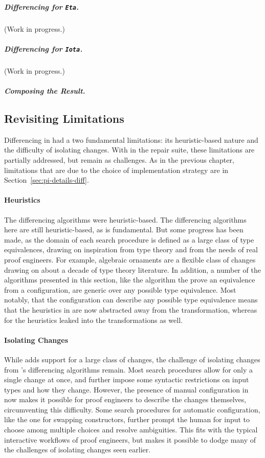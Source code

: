 \subparagraph*{Differencing for \lstinline{Eta}.} (Work in progress.)

\subparagraph*{Differencing for \lstinline{Iota}.} (Work in progress.)

\subparagraph*{Composing the Result.} %
\fi

\subsection{Revisiting Limitations}
\label{sec:pi-diff-limits}

Differencing in \sysname had a two fundamental limitations: its heuristic-based nature
and the difficulty of isolating changes.
With \toolnamec in the \sysnamelong repair suite, these limitations are partially addressed,
but remain as challenges.
As in the previous chapter, limitations that are due to the choice of implementation strategy are in Section~\ref{sec:pi-details-diff}.

\paragraph{Heuristics}
The \sysname differencing algorithms were heuristic-based.
The differencing algorithms here are still heuristic-based, as is fundamental.
But some progress has been made, as the domain of each search procedure is defined as a large class of type equivalences,
drawing on inspiration from type theory and from the needs of real proof engineers.
For example, algebraic ornaments are a flexible class of changes drawing on about a decade of type theory literature. %
In addition, a number of the algorithms presented in this section, like the algorithm the prove an equivalence from a configuration,
are generic over any possible type equivalence.
Most notably, that the configuration can describe any possible type equivalence
means that the heuristics in \toolnamec are now abstracted away from the transformation,
whereas for \sysname the heuristics leaked into the transformations as well.

\paragraph{Isolating Changes}
While \toolnamec adds support for a large class of changes,
the challenge of isolating changes from \sysname's differencing algorithms remain.
Most search procedures allow for only a single change at once,
and further impose some syntactic restrictions on input types and how they change.
However, the presence of manual configuration in \toolnamec now makes it possible for proof engineers to describe
the changes themselves, circumventing this difficulty.
Some search procedures for automatic configuration, like the one for swapping constructors,
further prompt the human for input to choose among multiple choices and resolve ambiguities.
This fits with the typical interactive workflows of proof engineers,
but makes it possible to dodge many of the challenges of isolating changes seen earlier.

